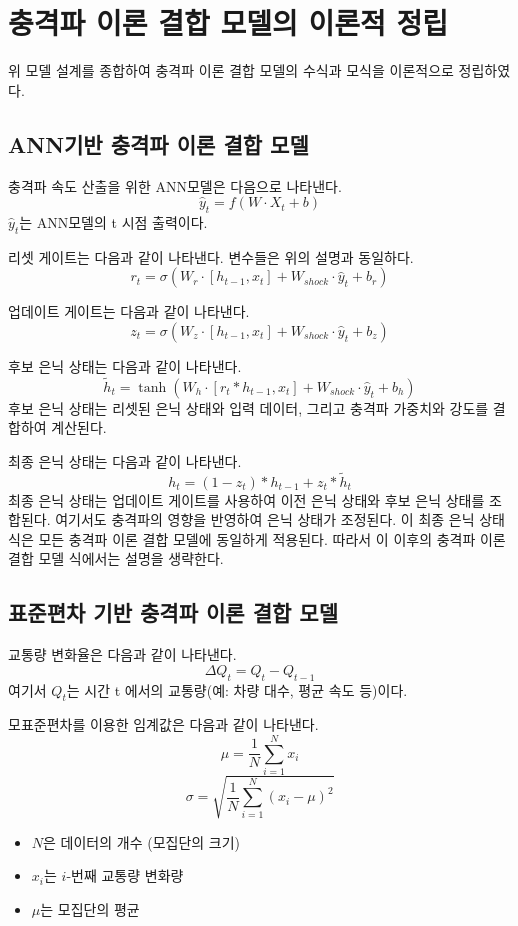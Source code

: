 \documentclass[11pt]{report}
\begin{document}
\section{충격파 이론 결합 모델의 이론적 정립}
위 모델 설계를 종합하여 충격파 이론 결합 모델의 수식과 모식을 이론적으로 정립하였다. 
\subsection{ANN기반 충격파 이론 결합 모델}
충격파 속도 산출을 위한 ANN모델은 다음으로 나타낸다. 
$$
\hat{y}_t = f(W \cdot X_t + b)
$$
$\hat{y}_t$는 ANN모델의 t 시점 출력이다. 

리셋 게이트는 다음과 같이 나타낸다. 변수들은 위의 설명과 동일하다. 
$$
r_t = \sigma(W_r \cdot [h_{t-1}, x_t] + W_{shock} \cdot \hat{y}_t + b_r)
$$

업데이트 게이트는 다음과 같이 나타낸다. 
$$
z_t = \sigma(W_z \cdot [h_{t-1}, x_t] + W_{shock} \cdot \hat{y}_t + b_z)
$$

후보 은닉 상태는 다음과 같이 나타낸다. 
$$
\tilde{h}_t = \tanh(W_h \cdot [r_t \ast h_{t-1}, x_t] + W_{shock} \cdot \hat{y}_t + b_h)
$$
후보 은닉 상태는 리셋된 은닉 상태와 입력 데이터, 그리고 충격파 가중치와 강도를 결합하여 계산된다.

최종 은닉 상태는 다음과 같이 나타낸다.
$$
h_t = (1 - z_t) \ast h_{t-1} + z_t \ast \tilde{h}_t
$$
최종 은닉 상태는 업데이트 게이트를 사용하여 이전 은닉 상태와 후보 은닉 상태를 조합된다. 
여기서도 충격파의 영향을 반영하여 은닉 상태가 조정된다.
이 최종 은닉 상태 식은 모든 충격파 이론 결합 모델에 동일하게 적용된다.
따라서 이 이후의 충격파 이론 결합 모델 식에서는 설명을 생략한다. 


\subsection{표준편차 기반 충격파 이론 결합 모델}
교통량 변화율은 다음과 같이 나타낸다. 
$$
\Delta Q_t = Q_t - Q_{t-1}
$$
여기서  $Q_t$는 시간  t 에서의 교통량(예: 차량 대수, 평균 속도 등)이다. 

모표준편차를 이용한 임계값은 다음과 같이 나타낸다. 
$$
\mu = \frac{1}{N} \sum_{i=1}^{N} x_i
$$
$$
\sigma = \sqrt{\frac{1}{N} \sum_{i=1}^{N} (x_i - \mu)^2}
$$

\begin{itemize}
    \item $N$은 데이터의 개수 (모집단의 크기)
    \item $x_i$는 $i$-번째 교통량 변화량
    \item $\mu$는 모집단의 평균
\end{itemize}
\end{document}
